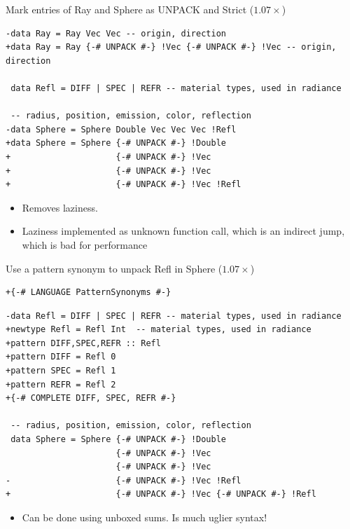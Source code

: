 \documentclass[8pt]{beamer}
\begin{document}

\begin{frame}[fragile]{Mark entries of Ray and Sphere as UNPACK and Strict ($1.07\times$)}

\begin{verbatim}
-data Ray = Ray Vec Vec -- origin, direction
+data Ray = Ray {-# UNPACK #-} !Vec {-# UNPACK #-} !Vec -- origin, direction

 data Refl = DIFF | SPEC | REFR -- material types, used in radiance

 -- radius, position, emission, color, reflection
-data Sphere = Sphere Double Vec Vec Vec !Refl
+data Sphere = Sphere {-# UNPACK #-} !Double 
+                     {-# UNPACK #-} !Vec 
+                     {-# UNPACK #-} !Vec 
+                     {-# UNPACK #-} !Vec !Refl
\end{verbatim}

\begin{itemize}
\item Removes laziness.
\item Laziness implemented as unknown function call, which is an indirect jump, which is bad for performance
\end{itemize}
\end{frame}



\begin{frame}[fragile]{Use a pattern synonym to unpack Refl in Sphere ($1.07\times$)}

\begin{verbatim}
+{-# LANGUAGE PatternSynonyms #-}
\end{verbatim}


\begin{verbatim}
-data Refl = DIFF | SPEC | REFR -- material types, used in radiance
+newtype Refl = Refl Int  -- material types, used in radiance
+pattern DIFF,SPEC,REFR :: Refl
+pattern DIFF = Refl 0
+pattern SPEC = Refl 1
+pattern REFR = Refl 2
+{-# COMPLETE DIFF, SPEC, REFR #-}

 -- radius, position, emission, color, reflection
 data Sphere = Sphere {-# UNPACK #-} !Double 
                      {-# UNPACK #-} !Vec
                      {-# UNPACK #-} !Vec 
-                     {-# UNPACK #-} !Vec !Refl
+                     {-# UNPACK #-} !Vec {-# UNPACK #-} !Refl

 \end{verbatim}

 \begin{itemize}
 \item Can be done using unboxed sums. Is much uglier syntax!
 \end{itemize}
\end{frame}
\end{document}
